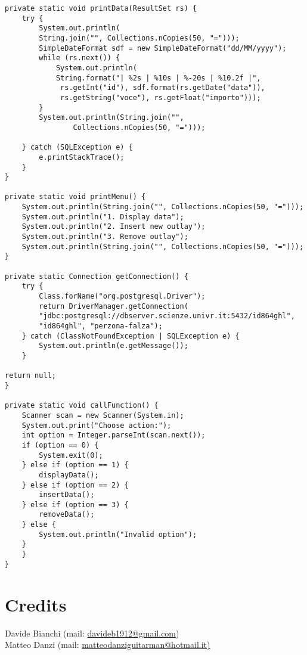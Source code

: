 \documentclass[a4paper, 10pt]{article}
\begin{document}
\begin{lstlisting}
private static void printData(ResultSet rs) {
	try {
		System.out.println(
		String.join("", Collections.nCopies(50, "=")));
		SimpleDateFormat sdf = new SimpleDateFormat("dd/MM/yyyy");
		while (rs.next()) {
			System.out.println(
			String.format("| %2s | %10s | %-20s | %10.2f |",
			 rs.getInt("id"), sdf.format(rs.getDate("data")), 
			 rs.getString("voce"), rs.getFloat("importo")));
		}
		System.out.println(String.join("", 
				Collections.nCopies(50, "=")));
	
	} catch (SQLException e) {
		e.printStackTrace();
	}
}

private static void printMenu() {
	System.out.println(String.join("", Collections.nCopies(50, "=")));
	System.out.println("1. Display data");
	System.out.println("2. Insert new outlay");
	System.out.println("3. Remove outlay");
	System.out.println(String.join("", Collections.nCopies(50, "=")));
}

private static Connection getConnection() {
	try {
		Class.forName("org.postgresql.Driver");
		return DriverManager.getConnection(
		"jdbc:postgresql://dbserver.scienze.univr.it:5432/id864ghl",
		"id864ghl", "perzona-falza");
	} catch (ClassNotFoundException | SQLException e) {
		System.out.println(e.getMessage());
	}

return null;
}

private static void callFunction() {
	Scanner scan = new Scanner(System.in);
	System.out.print("Choose action:");
	int option = Integer.parseInt(scan.next());
	if (option == 0) {
		System.exit(0);
	} else if (option == 1) {
		displayData();
	} else if (option == 2) {
		insertData();
	} else if (option == 3) {
		removeData();
	} else {
		System.out.println("Invalid option");
	}
    }
}
\end{lstlisting}


\section{Credits}
Davide Bianchi (mail: \url{davideb1912@gmail.com}) \\
Matteo Danzi (mail: \url{matteodanziguitarman@hotmail.it)}


			
\end{document}
